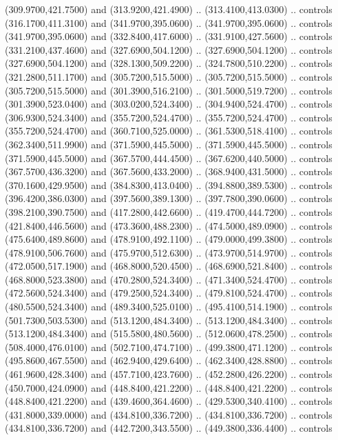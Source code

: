{{    (309.9700,421.7500) and (313.9200,421.4900) .. (313.4100,413.0300) .. controls
    (316.1700,411.3100) and (341.9700,395.0600) .. (341.9700,395.0600) .. controls
    (341.9700,395.0600) and (332.8400,417.6000) .. (331.9100,427.5600) .. controls
    (331.2100,437.4600) and (327.6900,504.1200) .. (327.6900,504.1200) .. controls
    (327.6900,504.1200) and (328.1300,509.2200) .. (324.7800,510.2200) .. controls
    (321.2800,511.1700) and (305.7200,515.5000) .. (305.7200,515.5000) .. controls
    (305.7200,515.5000) and (301.3900,516.2100) .. (301.5000,519.7200) .. controls
    (301.3900,523.0400) and (303.0200,524.3400) .. (304.9400,524.4700) .. controls
    (306.9300,524.3400) and (355.7200,524.4700) .. (355.7200,524.4700) .. controls
    (355.7200,524.4700) and (360.7100,525.0000) .. (361.5300,518.4100) .. controls
    (362.3400,511.9900) and (371.5900,445.5000) .. (371.5900,445.5000) .. controls
    (371.5900,445.5000) and (367.5700,444.4500) .. (367.6200,440.5000) .. controls
    (367.5700,436.3200) and (367.5600,433.2000) .. (368.9400,431.5000) .. controls
    (370.1600,429.9500) and (384.8300,413.0400) .. (394.8800,389.5300) .. controls
    (396.4200,386.0300) and (397.5600,389.1300) .. (397.7800,390.0600) .. controls
    (398.2100,390.7500) and (417.2800,442.6600) .. (419.4700,444.7200) .. controls
    (421.8400,446.5600) and (473.3600,488.2300) .. (474.5000,489.0900) .. controls
    (475.6400,489.8600) and (478.9100,492.1100) .. (479.0000,499.3800) .. controls
    (478.9100,506.7600) and (475.9700,512.6300) .. (473.9700,514.9700) .. controls
    (472.0500,517.1900) and (468.8000,520.4500) .. (468.6900,521.8400) .. controls
    (468.8000,523.3800) and (470.2800,524.3400) .. (471.3400,524.4700) .. controls
    (472.5600,524.3400) and (479.2500,524.3400) .. (479.8100,524.4700) .. controls
    (480.5500,524.3400) and (489.3400,525.0100) .. (495.4100,514.1900) .. controls
    (501.7300,503.5300) and (513.1200,484.3400) .. (513.1200,484.3400) .. controls
    (513.1200,484.3400) and (515.5800,480.5600) .. (512.0600,478.2500) .. controls
    (508.4000,476.0100) and (502.7100,474.7100) .. (499.3800,471.1200) .. controls
    (495.8600,467.5500) and (462.9400,429.6400) .. (462.3400,428.8800) .. controls
    (461.9600,428.3400) and (457.7100,423.7600) .. (452.2800,426.2200) .. controls
    (450.7000,424.0900) and (448.8400,421.2200) .. (448.8400,421.2200) .. controls
    (448.8400,421.2200) and (439.4600,364.4600) .. (429.5300,340.4100) .. controls
    (431.8000,339.0000) and (434.8100,336.7200) .. (434.8100,336.7200) .. controls
    (434.8100,336.7200) and (442.7200,343.5500) .. (449.3800,336.4400) .. controls
}}
